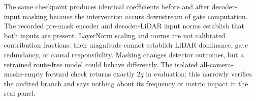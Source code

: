 The same checkpoint produces identical coefficients before and after decoder-input masking because the intervention occurs downstream of gate computation. The recorded pre-mask encoder and decoder-LiDAR input norms establish that both inputs are present. LayerNorm scaling and norms are not calibrated contribution fractions: their magnitude cannot establish LiDAR dominance, gate redundancy, or causal responsibility. Masking changes detector outcomes, but a retrained route-free model could behave differently. The isolated all-camera-masks-empty forward check returns exactly $2q$ in evaluation; this narrowly verifies the audited branch and says nothing about its frequency or metric impact in the real panel.
